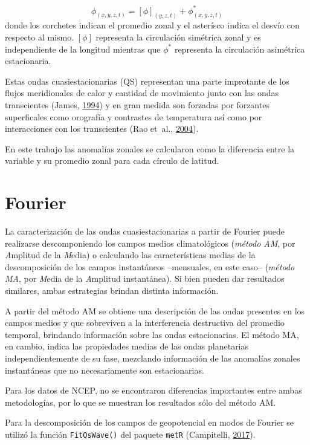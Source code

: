 \documentclass[spanish,a4paper,12pt,oneside]{book}
\begin{document}
\[
\phi_{(x, y, z, t)} = [\phi]_{(y, z, t)} + \phi_{(x, y, z, t)}^*
\] donde los corchetes indican el promedio zonal y el asterísco indica
el desvío con respecto al mismo. \([\phi]\) representa la circulación
simétrica zonal y es independiente de la longitud mientras que
\(\phi^*\) representa la circulación asimétrica estacionaria.

Estas ondas cuasiestacionarias (QS) representan una parte improtante de
los flujos meridionales de calor y cantidad de movimiento junto con las
ondas transcientes (James, \protect\hyperlink{ref-James}{1994}) y en
gran medida son forzadas por forzantes superficales como orografía y
contrastes de temperatura así como por interacciones con los
transcientes (Rao et~al., \protect\hyperlink{ref-Rao2004}{2004}).

En este trabajo las anomalías zonales se calcularon como la diferencia
entre la variable y su promedio zonal para cada círculo de latitud.

\section*{Fourier}

La caracterización de las ondas cuasiestacionarias a partir de Fourier
puede realizarse descomponiendo los campos medios climatológicos
(\emph{método AM}, por \emph{A}mplitud de la \emph{M}edia) o calculando
las características medias de la descomposición de los campos
instantáneos --mensuales, en este caso-- (\emph{método MA}, por
\emph{M}edia de la \emph{A}mplitud instantánea). Si bien pueden dar
resultados similares, ambas estrategias brindan distinta información.

A partir del método AM se obtiene una descripción de las ondas presentes
en los campos medios y que sobreviven a la interferencia destructiva del
promedio temporal, brindando información sobre las ondas estacionarias.
El método MA, en cambio, indica las propiedades medias de las ondas
planetarias independientemente de su fase, mezclando información de las
anomalías zonales instantáneas que no necesariamente son estacionarias.

Para los datos de NCEP, no se encontraron diferencias importantes entre
ambas metodologías, por lo que se muestran los resultados sólo del
método AM.

Para la descomposición de los campos de geopotencial en modos de Fourier
se utilizó la función \texttt{FitQsWave()} del paquete \texttt{metR}
(Campitelli, \protect\hyperlink{ref-R-metR}{2017}).
\end{document}
